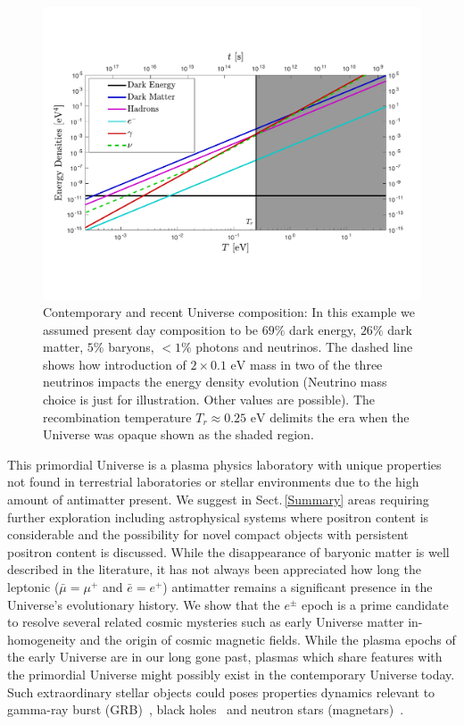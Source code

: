 \documentclass[universe,article,submit,moreauthors,pdftex,a4paper]{Definitions/mdpi}
\newcommand{\eV}{\text{ eV}}
\newcommand*{\rsec}[1]{Sect.\,{\ref{#1}}}
\begin{document}
\begin{figure}[ht]
 \centerline{\includegraphics[trim=20 90 30 90,clip,width=\textwidth]{./plots/energy_densities_new.pdf}}
 \caption{Contemporary and recent Universe composition: In this example we assumed present day composition to be $69\%$ dark energy, $26\%$ dark matter, $5\%$ baryons, $<1\%$ photons and neutrinos. The dashed line shows how introduction of $2\times 0.1\eV$ mass in two of the three neutrinos impacts the energy density evolution (Neutrino mass choice is just for illustration. Other values are possible). The recombination temperature $T_{r}\approx0.25\eV$ delimits the era when the Universe was opaque shown as the shaded region. \label{CosmicDensity}}
\end{figure}

This primordial Universe is a plasma physics laboratory with unique properties not found in terrestrial laboratories or stellar environments due to the high amount of antimatter present. We suggest in \rsec{Summary} areas requiring further exploration including astrophysical systems where positron content is considerable and the possibility for novel compact objects with persistent positron content is discussed. While the disappearance of baryonic matter is well described in the literature, it has not always been appreciated how long the leptonic ($\bar{\mu}=\mu^{+}$ and $\bar{e}=e^{+}$) antimatter remains a significant presence in the Universe's evolutionary history. We show that the $e^{\pm}$ epoch is a prime candidate to resolve several related cosmic mysteries such as early Universe matter in-homogeneity and the origin of cosmic magnetic fields. While the plasma epochs of the early Universe are in our long gone past, plasmas which share features with the primordial Universe might possibly exist in the contemporary Universe today. Such extraordinary stellar objects could poses properties dynamics relevant to gamma-ray burst (GRB)~\cite{Ruffini:2001fe,Aksenov:2008ze,Aksenov:2010vi,Ruffini:2012it}, black holes~\cite{Ruffini:2003yt,Ruffini:2009hg,Ruffini:2000yu} and neutron stars (magnetars)~\cite{Han:2011er,Belvedere:2012uc}.
\end{document}
